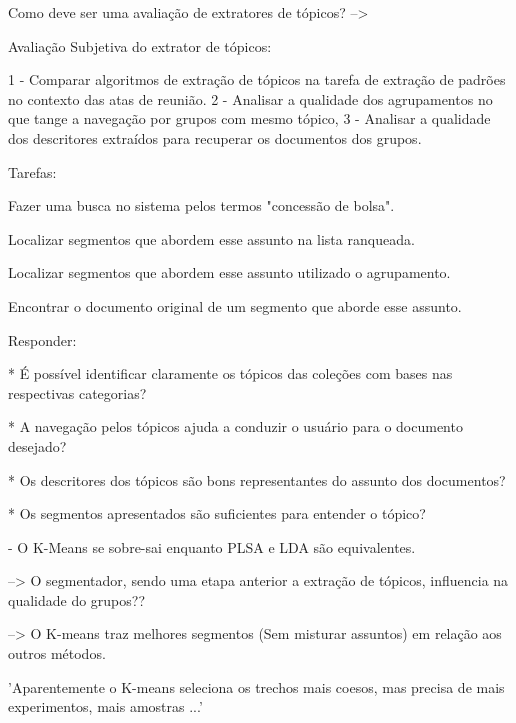 

Como deve ser uma avaliação de extratores de tópicos? --> 







Avaliação Subjetiva do extrator de tópicos:

1 - Comparar algoritmos de extração de tópicos na tarefa de extração de padrões no contexto
das atas de reunião. 
2 - Analisar a qualidade dos agrupamentos no que tange a navegação por grupos com mesmo tópico, 
3 - Analisar a qualidade dos descritores extraídos para recuperar os documentos dos grupos.


Tarefas:

Fazer uma busca no sistema pelos termos "concessão de bolsa".

Localizar segmentos que abordem esse assunto na lista ranqueada.

Localizar segmentos que abordem esse assunto utilizado o agrupamento.

Encontrar o documento original de um segmento que aborde esse assunto.

Responder:


* É possível identificar claramente os tópicos das coleções com bases nas respectivas categorias?


* A navegação pelos tópicos ajuda a conduzir o usuário para o documento desejado?


* Os descritores dos tópicos são bons representantes do assunto dos documentos?


* Os segmentos apresentados são suficientes para entender o tópico?








 - O K-Means se sobre-sai enquanto PLSA e LDA são equivalentes.


--> O segmentador, sendo uma etapa anterior a extração de tópicos, influencia na qualidade do grupos??

--> O K-means traz melhores segmentos (Sem misturar assuntos) em relação aos outros métodos.


'Aparentemente o K-means seleciona os trechos mais coesos, mas precisa de mais experimentos, mais amostras ...'




